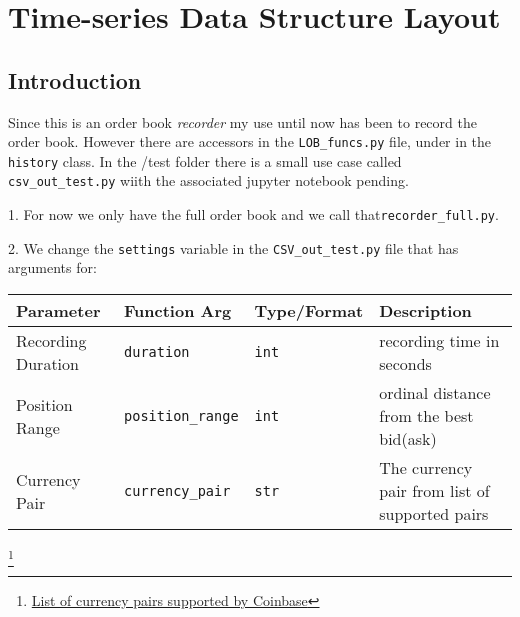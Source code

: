 \section{Time-series Data Structure Layout}

\subsection{Introduction}


Since this is an order book \textit{recorder} my use until now has been to record the order book. However there are accessors in the \texttt{LOB\_funcs.py} file, under in the \texttt{history} class. In the /test folder there is a small use case called \texttt{csv\_out\_test.py} wiith the associated jupyter notebook pending.

1. For now we only have the full order book and we call that\texttt{recorder\_full.py}. 

2. We change the \texttt{settings} variable in the \texttt{CSV\_out\_test.py} file that has arguments for:

\begin{center}
	\begin{tabular}{|l|l|l|l|}
		\hline
		Parameter & Function Arg & Type/Format & Description \\
		\hline
		Recording Duration & \texttt{duration}& \texttt{int} & recording time in seconds\\
		Position Range & \texttt{position\_range} & \texttt{int} & ordinal distance from the best bid(ask)\\
		Currency Pair & \texttt{currency\_pair} & \texttt{str} & The currency pair from list of supported pairs\\
		\hline
	\end{tabular}
\end{center}

\footnote{\href{https://help.coinbase.com/en/pro/trading-and-funding/cryptocurrency-trading-pairs/locations-and-trading-pairs}{List of currency pairs supported by Coinbase}}


